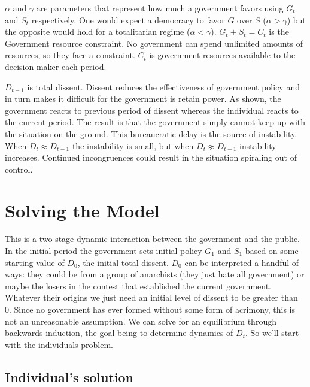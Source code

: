 \documentclass[12pt]{article}
\begin{document}
\begin{spacing}{1.5}
$\alpha$ and $\gamma $  are parameters that represent how much a government favors using $G_t$ and $S_t$ respectively. One would expect a democracy to favor $G$ over $S$ ($\alpha > \gamma$) but the opposite would hold for a totalitarian regime ($\alpha < \gamma $). $G_t+S_t=C_t$ is the Government resource constraint. No government can spend unlimited amounts of resources, so they face a constraint. $C_t$ is government resources available to the decision maker each period. 

$D_{t-1}$ is total dissent. Dissent reduces the effectiveness of government policy and in turn makes it difficult for the government is retain power. As shown, the government reacts to previous period of dissent whereas the individual reacts to the current period. The result is that the government simply cannot keep up with the situation on the ground. This bureaucratic delay is the source of instability. When $D_t \approx D_{t-1}$ the instability is small, but when $D_t \not\approx D_{t-1}$ instability increases. Continued incongruences could result in the situation spiraling out of control. 



\section{Solving the Model}

This is a two stage dynamic interaction between the government and the public. In the initial period the government sets initial policy $G_1$ and $S_1$ based on some starting value of $D_0$, the initial total dissent. $D_0$ can be interpreted a handful of ways: they could be from a group of anarchists (they just hate all government) or maybe the losers in the contest that established the current government. Whatever their origins we just need an initial level of dissent to be greater than 0. Since no government has ever formed without some form of acrimony, this is not an unreasonable assumption. We can solve for an equilibrium through backwards induction, the goal being to determine dynamics of $D_t$. So we'll start with the individuals problem. 

\subsection{Individual's solution}



\end{spacing}
\end{document}
